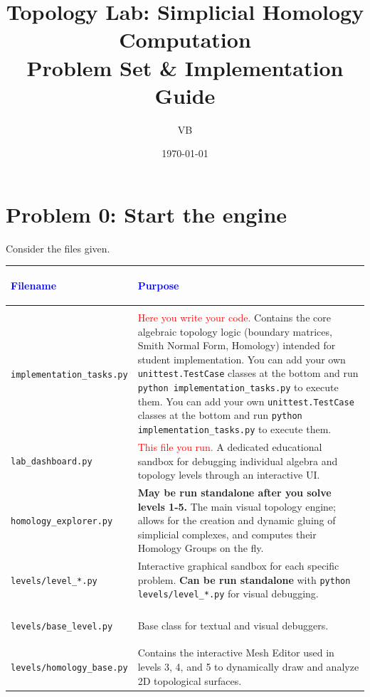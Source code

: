 \documentclass[11pt]{article}
\title{Topology Lab: Simplicial Homology Computation \\ \large Problem Set \& Implementation Guide}
\author{VB}
\date{\today}
\begin{document}
\maketitle

\section*{Problem 0: Start the engine}

Consider the files given.
\begin{center}
\renewcommand{\arraystretch}{1.5}
\begin{tabularx}{\textwidth}{@{} >{\bfseries\raggedright\arraybackslash}p{5.5cm} X @{}}
\toprule
\textcolor{blue}{Filename} & \textcolor{blue}{Purpose} \\ \midrule
\multicolumn{2}{@{}l}{\textbf{Direct Interaction}} \\ \midrule
\lstinline|implementation_tasks.py| & \textcolor{red}{Here you write your code.} Contains the core algebraic topology logic (boundary matrices, Smith Normal Form, Homology) intended for student implementation. You can add your own \lstinline|unittest.TestCase| classes at the bottom and run \lstinline|python implementation_tasks.py| to execute them. You can add your own \lstinline|unittest.TestCase| classes at the bottom and run \lstinline|python implementation_tasks.py| to execute them. \\
\lstinline|lab_dashboard.py| & \textcolor{red}{This file you run.} A dedicated educational sandbox for debugging individual algebra and topology levels through an interactive UI. \\
\lstinline|homology_explorer.py| & \textbf{May be run standalone after you solve levels 1-5.} The main visual topology engine; allows for the creation and dynamic gluing of simplicial complexes, and computes their Homology Groups on the fly. \\
\lstinline|levels/level_*.py| & Interactive graphical sandbox for each specific problem. \textbf{Can be run standalone} with \lstinline|python levels/level_*.py| for visual debugging. \\ \midrule
\multicolumn{2}{@{}l}{\textbf{Under the Hood}} \\ \midrule
\lstinline|levels/base_level.py| & Base class for textual and visual debuggers.\\
\lstinline|levels/homology_base.py| & Contains the interactive Mesh Editor used in levels 3, 4, and 5 to dynamically draw and analyze 2D topological surfaces.\\
\bottomrule
\end{tabularx}
\end{center}
\end{document}

